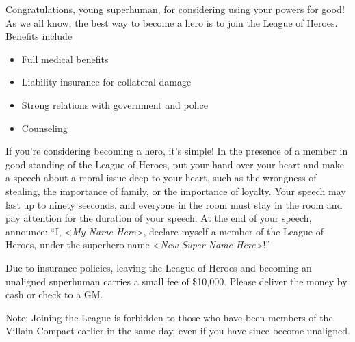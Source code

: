 \documentclass[white]{guildcamp1}
\begin{document}
\name{\wHeroRecruitment{}}

Congratulations, young superhuman, for considering using your powers for good!  As we all know, the best way to become a hero is to join the League of Heroes.  Benefits include

\begin{itemize}
\item Full medical benefits
\item Liability insurance for collateral damage
\item Strong relations with government and police
\item Counseling
\end{itemize}

If you're considering becoming a hero, it's simple!  In the presence of a member in good standing of the League of Heroes, put your hand over your heart and make a speech  about a moral issue deep to your heart, such as the wrongness of stealing, the importance of family, or the importance of loyalty.  Your speech may last up to ninety seeconds, and everyone in the room must stay in the room and pay attention for the duration of your speech.  At the end of your speech, announce: ``I, <\textit{My Name Here}>, declare myself a member of the League of Heroes, under the superhero name <\textit{New Super Name Here}>!''

Due to insurance policies, leaving the League of Heroes and becoming an unaligned superhuman carries a small fee of \$10,000.  Please deliver the money by cash or check to a GM.

Note: Joining the League is forbidden to those who have been members of the Villain Compact earlier in the same day, even if you have since become unaligned.
\end{document}
